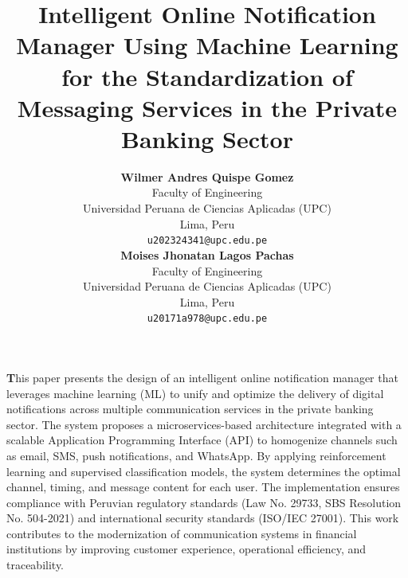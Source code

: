 \documentclass[conference]{IEEEtran}
\newenvironment{customabstract}{
  \vspace{1em}
  \noindent{\emph{\textbf{Abstract —}}}\hspace{0.5em}\textbf
}{\par\vspace{1em}}
\begin{document}
\title{Intelligent Online Notification Manager Using Machine Learning for the Standardization of Messaging Services in the Private Banking Sector}

\author{
  {\small
    \begin{minipage}[t]{0.45\textwidth}
      \centering
      \textbf{Wilmer Andres Quispe Gomez}\\
      Faculty of Engineering\\
      Universidad Peruana de Ciencias Aplicadas (UPC)\\
      Lima, Peru\\
      \texttt{u202324341@upc.edu.pe}
    \end{minipage}
    \hfill
    \begin{minipage}[t]{0.45\textwidth}
      \centering
      \textbf{Moises Jhonatan Lagos Pachas}\\
      Faculty of Engineering\\
      Universidad Peruana de Ciencias Aplicadas (UPC)\\
      Lima, Peru\\
      \texttt{u20171a978@upc.edu.pe}
    \end{minipage}
  }
}

\maketitle

\begin{customabstract}
This paper presents the design of an intelligent online notification manager that leverages machine learning (ML) to unify and optimize the delivery of digital notifications across multiple communication services in the private banking sector. The system proposes a microservices-based architecture integrated with a scalable Application Programming Interface (API) to homogenize channels such as email, SMS, push notifications, and WhatsApp. By applying reinforcement learning and supervised classification models, the system determines the optimal channel, timing, and message content for each user. The implementation ensures compliance with Peruvian regulatory standards (Law No. 29733, SBS Resolution No. 504-2021) and international security standards (ISO/IEC 27001). This work contributes to the modernization of communication systems in financial institutions by improving customer experience, operational efficiency, and traceability.
\end{customabstract}
\end{document}

